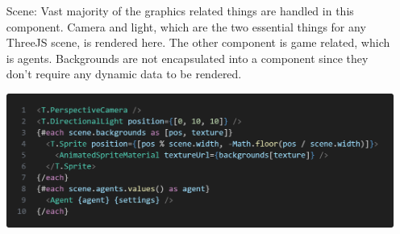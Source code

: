 \documentclass{article}
\begin{document}
\begin{itemize}
    \item[Scene:] Vast majority of the graphics related things are handled in this component. Camera and light, which are the two essential things for any ThreeJS scene, is rendered here. The other component is game related, which is agents. Backgrounds are not encapsulated into a component since they don't require any dynamic data to be rendered.\\
    \begin{minipage}{\linewidth}
        \centering
        \includegraphics[width=1\textwidth]{scene-markup.png}
    \end{minipage}\\\\    
    

\end{itemize}
\end{document}
